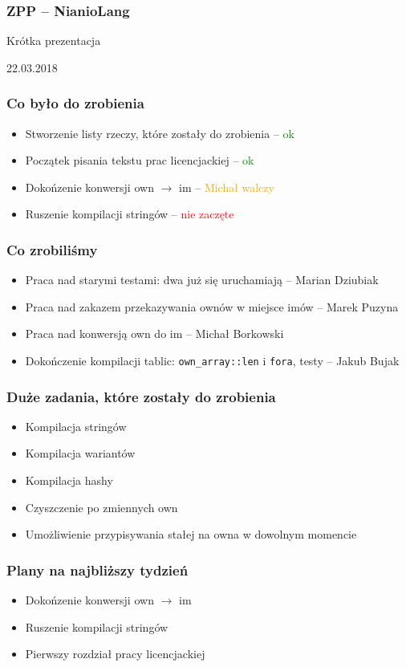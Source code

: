 \documentclass{beamer}
\begin{document}
	\begin{frame}
		\frametitle{ZPP -- NianioLang}
		Krótka prezentacja
		
		22.03.2018
	\end{frame}
	
	\begin{frame}
		\frametitle{Co było do zrobienia}
		\begin{itemize}
			\item Stworzenie listy rzeczy, które zostały do zrobienia -- \textcolor{green}{ok}
			\item Początek pisania tekstu prac licencjackiej -- \textcolor{green}{ok}
			\item Dokońzenie konwersji own $\rightarrow$ im -- \textcolor{orange}{Michał walczy}
			\item Ruszenie kompilacji stringów -- \textcolor{red}{nie zaczęte}
		\end{itemize}
	\end{frame}

	\begin{frame}
		\frametitle{Co zrobiliśmy}
		\begin{itemize}
			\item Praca nad starymi testami: dwa już się uruchamiają -- Marian Dziubiak
			\item Praca nad zakazem przekazywania ownów w miejsce imów -- Marek Puzyna
			\item Praca nad konwersją own do im -- Michał Borkowski
			\item Dokończenie kompilacji tablic: \texttt{own\_array::len} i \texttt{fora}, testy -- Jakub Bujak
		\end{itemize}
	\end{frame}
	
	\begin{frame}	
		\frametitle{Duże zadania, które zostały do zrobienia}
		\begin{itemize}
			\item Kompilacja stringów
			\item Kompilacja wariantów
			\item Kompilacja hashy
			\item Czyszczenie po zmiennych own
			\item Umożliwienie przypisywania stałej na owna w dowolnym momencie
		\end{itemize}
	\end{frame}

	
	\begin{frame}
		\frametitle{Plany na najbliższy tydzień}
		\begin{itemize}
			\item Dokońzenie konwersji own $\rightarrow$ im
			\item Ruszenie kompilacji stringów
			\item Pierwszy rozdział pracy licencjackiej
		\end{itemize}
	\end{frame}
\end{document}
